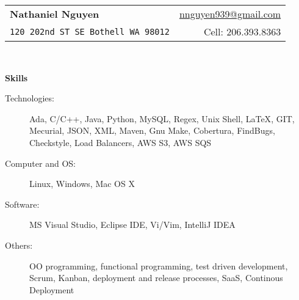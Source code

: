 \documentclass[letterpaper,11pt]{article}
\newcommand{\resheading}[1]{{\large \colorbox{mygrey}{\begin{minipage}{\textwidth}{\textbf{#1 \vphantom{p\^{E}}}}\end{minipage}}}}
\begin{document}
\newcommand{\mywebheader}{
\begin{tabular*}{7in}{l@{\extracolsep{\fill}}r}
	\textbf{{\LARGE Nathaniel Nguyen}} & \href{mailto:nnguyen939@gmail.com}{nnguyen939@gmail.com}\\
	{\footnotesize \texttt{{120 202nd ST SE Bothell WA 98012}}} & 
	{Cell:  206.393.8363}
	\end{tabular*}
\\
\vspace{0.1in}}

\mywebheader

\resheading{{Skills}}
	\begin{description}
		\item[Technologies:] { \footnotesize Ada, C/C++, Java, Python, MySQL, Regex, Unix Shell, {\LaTeX}, GIT, Mecurial, JSON, XML, Maven, Gnu Make, Cobertura, FindBugs, Checkstyle, Load Balancers, AWS S3, AWS SQS}
		\item[Computer and OS:] { \footnotesize Linux, Windows, Mac OS X}
		\item[Software:]{\footnotesize
			{MS Visual Studio},
			{Eclipse IDE},
			{Vi/Vim}, {IntelliJ IDEA}} 
		\item[Others:] {\footnotesize OO programming, functional programming,  test driven development, Scrum,  Kanban, deployment and release processes, SaaS, Continous Deployment}
	\end{description} %
	
\end{document}
